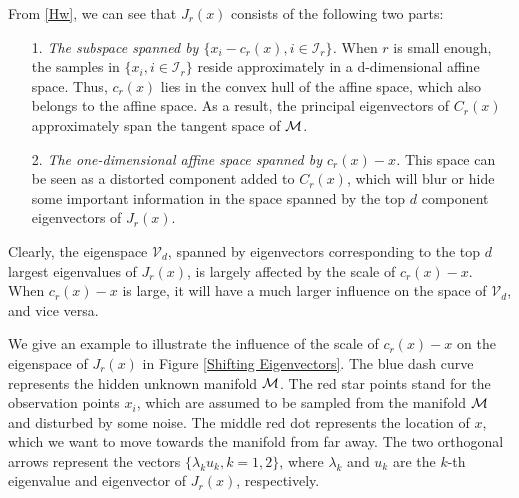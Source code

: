 \documentclass[aos,preprint]{imsart}
\theoremstyle{remark}
\begin{document}
From \eqref{Hw}, we can see that $J_r(x)$ consists of the following two parts:
\begin{itemize}
\item[1.] {\it The subspace spanned by $\{x_i-c_r(x), i\in {\mathcal I}_r\}$.} 
When $r$ is small enough, the samples in $\{x_i, i\in {\mathcal I}_r\}$ reside approximately in a d-dimensional affine space. Thus, $c_r(x)$ lies in the convex hull of the affine space, which also belongs to the affine space. As a result, the principal eigenvectors of $C_r(x)$ approximately span the tangent space of $\cal M$.%
\item[2.]{\it The one-dimensional affine space spanned by $c_r(x)-x$.}
This space can be seen as a distorted component added to $C_r(x)$, which will blur or hide some important information in the space spanned by the top $d$ component eigenvectors of $J_r(x)$.
\end{itemize}
Clearly, the eigenspace ${\mathcal V}_d$, spanned by eigenvectors corresponding to the top $d$ largest eigenvalues of $J_r(x)$, is largely affected by the scale of $c_r(x)-x$. When $c_r(x)-x$ is large, it will have a much larger influence on the space of ${\mathcal V}_d$, and vice versa.

We give an example to illustrate the influence of the scale of $c_r(x)-x$ on the eigenspace of $J_r(x)$ in Figure \ref{Shifting Eigenvectors}. The blue dash curve represents the hidden unknown manifold $\cal M$. The red star points stand for the observation points $x_i$, which are assumed to be sampled from the manifold $\cal M$ and disturbed by some noise. The middle red dot represents the location of $x$, which we want to move towards the manifold from far away. The two orthogonal arrows represent the vectors $\{\lambda_k u_k, k=1,2\}$, where $\lambda_k$ and $u_k$ are the $k$-th eigenvalue and eigenvector of $J_r(x)$, respectively.
\end{document}
